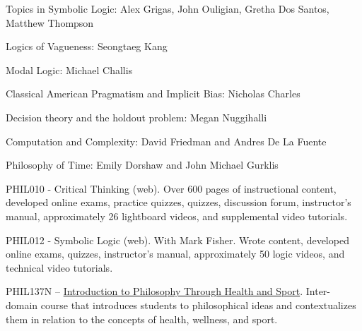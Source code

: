 \documentclass[p1noheader, 11pt, lightmode]{lightcv}
\begin{document}
\begin{rlist} 
\item Topics in Symbolic Logic: Alex Grigas, John Ouligian, Gretha Dos Santos, Matthew Thompson
\item Logics of Vagueness: Seongtaeg Kang
\item Modal Logic: Michael Challis
\item Classical American Pragmatism and Implicit Bias: Nicholas Charles
\item Decision theory and the holdout problem: Megan Nuggihalli
\item Computation and Complexity: David Friedman and Andres De La Fuente
\item Philosophy of Time: Emily Dorshaw and John Michael Gurklis
\end{rlist}

\begin{rlist}    
    \item PHIL010 - Critical Thinking (web). Over 600 pages of instructional content, developed online exams, practice quizzes, quizzes, discussion forum, instructor’s manual, approximately
    26 lightboard videos, and supplemental video tutorials.
    \item PHIL012 - Symbolic Logic (web). With Mark Fisher. Wrote content, developed online exams, quizzes, instructor’s manual, approximately 50 logic videos, and technical video tutorials.
    \item PHIL137N – \href{https://bulletins.psu.edu/university-course-descriptions/undergraduate/phil/}{Introduction to Philosophy Through Health and Sport}. Inter-domain course that introduces students to philosophical ideas and contextualizes them in relation to the concepts of health, wellness, and sport.
\end{rlist}
\end{document}
